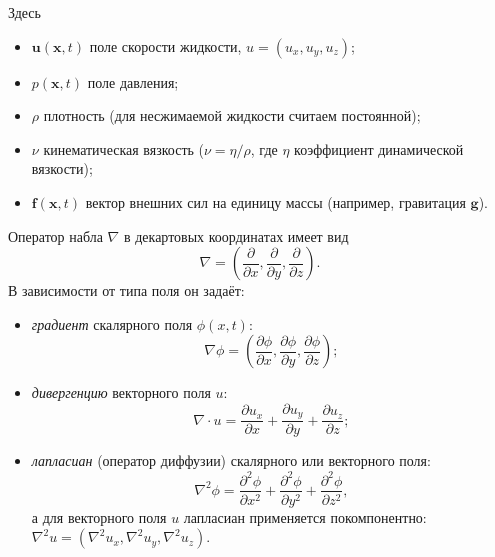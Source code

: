 Здесь
\begin{itemize}
  \item \(\mathbf{u}(\mathbf{x},t)\) \textemdash{} поле скорости жидкости,
        \(u=(u_x,u_y,u_z)\);
  \item \(p(\mathbf{x},t)\) \textemdash{} поле давления;
  \item \(\rho\) \textemdash{} плотность (для несжимаемой жидкости считаем
        постоянной);
  \item \(\nu\) \textemdash{} кинематическая вязкость (\(\nu=\eta/\rho\), где \(\eta\) \textemdash{} коэффициент динамической вязкости);
  \item \(\mathbf{f}(\mathbf{x},t)\) \textemdash{} вектор внешних сил
        на единицу массы (например, гравитация \(\mathbf{g}\)).
\end{itemize}

Оператор набла \(\nabla\) в декартовых координатах имеет вид
\begin{equation}
  \nabla =
  \left(
  \frac{\partial}{\partial x},
  \frac{\partial}{\partial y},
  \frac{\partial}{\partial z}
  \right).
\end{equation}
В зависимости от типа поля он задаёт:
\begin{itemize}
  \item \textit{градиент} скалярного поля \(\phi(x,t)\):
        \begin{equation}
          \nabla\phi =
          \left(
          \frac{\partial\phi}{\partial x},
          \frac{\partial\phi}{\partial y},
          \frac{\partial\phi}{\partial z}
          \right);
        \end{equation}
  \item \textit{дивергенцию} векторного поля \(u\):
        \begin{equation}
          \nabla\cdot u
          =
          \frac{\partial u_x}{\partial x}
          + \frac{\partial u_y}{\partial y}
          + \frac{\partial u_z}{\partial z};
        \end{equation}
  \item \textit{лапласиан} (оператор диффузии)
        скалярного или векторного поля:
        \begin{equation}
          \nabla^{2}\phi
          =
          \frac{\partial^{2}\phi}{\partial x^{2}}
          +
          \frac{\partial^{2}\phi}{\partial y^{2}}
          +
          \frac{\partial^{2}\phi}{\partial z^{2}},
        \end{equation}
        а для векторного поля \(u\) лапласиан применяется
        покомпонентно:
        \(\nabla^{2}u
        = (\nabla^{2}u_x,\nabla^{2}u_y,\nabla^{2}u_z)\).
\end{itemize}

